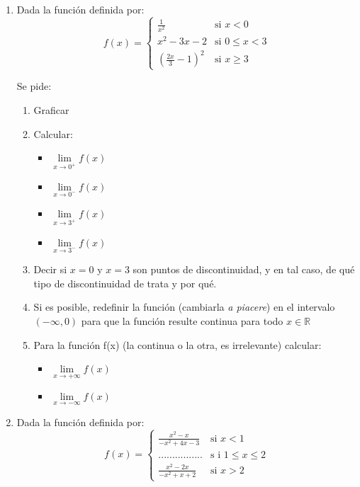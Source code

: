 \documentclass[12pt]{article}
\theoremstyle{definition}
\begin{document}
\begin{enumerate}

\item  
Dada la función definida por:
\begin{equation*}
f(x) = 
\begin{cases} 
 \frac{1}{x^2}  & \text{si      } x < 0 \\
x^2-3x-2& \text{si  } 0\leq x < 3\\
(\frac{2x}{3} - 1)^2  & \text{si     } x \geq 3
\end{cases}
\end{equation*}

Se pide:

 \begin{enumerate}
        \item Graficar
        \item Calcular:
\begin{itemize}
\item  $\lim\limits_{x \to 0^+} f(x) $
\item  $\lim\limits_{x \to 0^-} f(x) $
\item  $\lim\limits_{x \to 3^+} f(x) $
\item  $\lim\limits_{x \to 3^-} f(x) $
\end{itemize}
        \item Decir si $x = 0$ y $x = 3$ son puntos de discontinuidad, y en tal caso, de qué tipo de discontinuidad de trata y por qué.
        \item Si es posible, redefinir la función (cambiarla \textit{a piacere}) en el intervalo $(-\infty, 0)$ para que la función resulte continua para todo  $x \in \mathbb{R}$ 
        \item Para la función f(x) (la continua o la otra, es irrelevante) calcular:
\begin{itemize}
\item  $\lim\limits_{x \to +\infty} f(x) $
\item  $\lim\limits_{x \to -\infty} f(x) $
\end{itemize}
\end{enumerate}

\item  
Dada la función definida por:
\begin{equation*}
	f(x) = 
	\begin{cases} 
		\frac{x^2-x}{-x^2+4x-3}  & \text{si  } x <1 \\
		................& \text{s i } 1\leq x \leq  2\\
		\frac{x^2-2x}{-x^2+x+2}  & \text{si  } x > 2
	\end{cases}
\end{equation*}


\end{enumerate}
\end{document}
